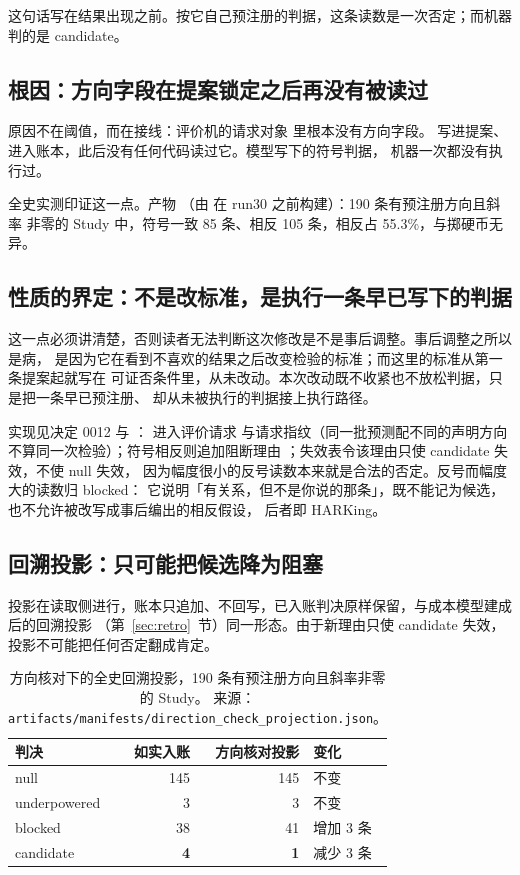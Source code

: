 这句话写在结果出现之前。按它自己预注册的判据，这条读数是一次否定；而机器判的是 candidate。

\subsection{根因：方向字段在提案锁定之后再没有被读过}

原因不在阈值，而在接线：评价机的请求对象  里根本没有方向字段。
 写进提案、进入账本，此后没有任何代码读过它。模型写下的符号判据，
机器一次都没有执行过。

全史实测印证这一点。产物 
（由  在 run30 之前构建）：190 条有预注册方向且斜率
非零的 Study 中，符号一致 85 条、相反 105 条，相反占 55.3\%，与掷硬币无异。

\subsection{性质的界定：不是改标准，是执行一条早已写下的判据}

这一点必须讲清楚，否则读者无法判断这次修改是不是事后调整。事后调整之所以是病，
是因为它在看到不喜欢的结果之后改变检验的标准；而这里的标准从第一条提案起就写在
可证否条件里，从未改动。本次改动既不收紧也不放松判据，只是把一条早已预注册、
却从未被执行的判据接上执行路径。

实现见决定 0012 与 ： 进入评价请求
与请求指纹（同一批预测配不同的声明方向不算同一次检验）；符号相反则追加阻断理由
；失效表令该理由只使 candidate 失效，不使 null 失效，
因为幅度很小的反号读数本来就是合法的否定。反号而幅度大的读数归 blocked：
它说明「有关系，但不是你说的那条」，既不能记为候选，也不允许被改写成事后编出的相反假设，
后者即 HARKing。

\subsection{回溯投影：只可能把候选降为阻塞}

投影在读取侧进行，账本只追加、不回写，已入账判决原样保留，与成本模型建成后的回溯投影
（第~\ref{sec:retro}~节）同一形态。由于新理由只使 candidate 失效，投影不可能把任何否定翻成肯定。

\begin{table}[htbp]\centering\footnotesize
\begin{tabular}{@{}>{\raggedright\arraybackslash}p{} r r >{\raggedright\arraybackslash}p{}@{}}
\toprule
判决 & 如实入账 & 方向核对投影 & 变化 \\ \midrule
null & 145 & 145 & 不变 \\
underpowered & 3 & 3 & 不变 \\
blocked & 38 & 41 & 增加 3 条 \\
candidate & \textbf{4} & \textbf{1} & 减少 3 条 \\
\bottomrule\end{tabular}
\caption{方向核对下的全史回溯投影，190 条有预注册方向且斜率非零的 Study。
来源：\texttt{artifacts/manifests/direction\_check\_projection.json}。}
\end{table}

